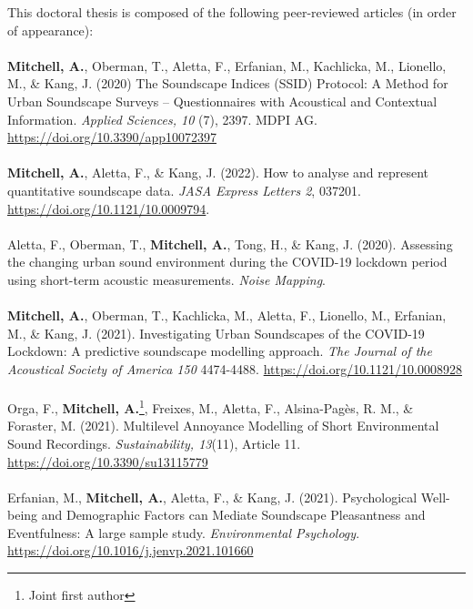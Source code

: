 \documentclass[twoside,fontsize=11pt,titlepage,chapterprefix=true
]{scrbook}
\begin{document}
This doctoral thesis is composed of the following peer-reviewed articles (in order of appearance):

\paragraph*{}
\textbf{Mitchell, A.}, Oberman, T., Aletta, F., Erfanian, M., Kachlicka, M., Lionello, M., \& Kang, J. (2020) The Soundscape Indices (SSID) Protocol: A Method for Urban Soundscape Surveys -- Questionnaires with Acoustical and Contextual Information. \emph{Applied Sciences, 10} (7), 2397. MDPI AG. \url{https://doi.org/10.3390/app10072397}

\paragraph*{}
\textbf{Mitchell, A.}, Aletta, F., \& Kang, J. (2022). How to analyse and represent quantitative soundscape data. \emph{JASA Express Letters 2}, 037201. \url{https://doi.org/10.1121/10.0009794}.


\paragraph*{}
Aletta, F., Oberman, T., \textbf{Mitchell, A.}, Tong, H., \& Kang, J. (2020). Assessing the changing urban sound environment during the COVID-19 lockdown period using short-term acoustic measurements. \emph{Noise Mapping}.

\paragraph*{}
\textbf{Mitchell, A.}, Oberman, T., Kachlicka, M., Aletta, F., Lionello, M., Erfanian, M., \& Kang, J. (2021). Investigating Urban Soundscapes of the COVID-19 Lockdown: A predictive soundscape modelling approach. \emph{The Journal of the Acoustical Society of America 150} 4474-4488. \url{https://doi.org/10.1121/10.0008928}

\paragraph*{}
Orga, F., \textbf{Mitchell, A.}\footnote{Joint first author}, Freixes, M., Aletta, F., Alsina-Pagès, R. M., \& Foraster, M. (2021). Multilevel Annoyance Modelling of Short Environmental Sound Recordings. \emph{Sustainability, 13}(11), Article 11. \url{https://doi.org/10.3390/su13115779}

\paragraph*{}
Erfanian, M., \textbf{Mitchell, A.}, Aletta, F., \& Kang, J. (2021). Psychological Well-being and Demographic Factors can Mediate Soundscape Pleasantness and Eventfulness: A large sample study. \emph{Environmental Psychology}. \url{https://doi.org/10.1016/j.jenvp.2021.101660}
\end{document}
